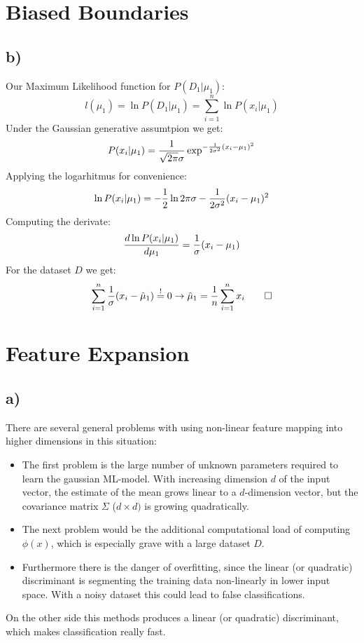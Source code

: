 \documentclass[paper=a4,fontsize=10pt,DIV11,BCOR10mm]{scrartcl}
\begin{document}
\section{Biased Boundaries}
\subsection*{b)}
	Our Maximum Likelihood function for $P(D_1|\mu_1)$:
	\[
	l(\mu_1) = \ln P(D_1|\mu_1) = \sum_{i=1}^n \ln P(x_i|\mu_1)
	\]
	Under the Gaussian generative assumtpion we get:
	\[
		P(x_i|\mu_1) = \frac{1}{\sqrt{2\pi}\sigma}\exp^{-\frac{1}{2\sigma^2}(x_i-\mu_1)^2}\\
	\]
	Applying the logarhitmus for convenience:
	\[
		\ln P(x_i|\mu_1) =-\frac{1}{2} \ln 2\pi \sigma -\frac{1}{2\sigma^2}(x_i-\mu_1)^2\\
	\]
	Computing the derivate:
	\[	
		\frac{d \ln P(x_i|\mu_1)}{d \mu_1} = \frac{1}{\sigma}(x_i- \mu_1)\\
	\]
	For the dataset $D$ we get:
	\[
		\sum_{i=1}^n \frac{1}{\sigma}(x_i- \hat{\mu}_1) \stackrel{!}{=} 0\\
	\rightarrow \hat{\mu}_1=\frac{1}{n} \sum_{i=1}^n x_i \qed
	\]
\section{Feature Expansion}
	\subsection*{a)} There are several general problems with using non-linear feature mapping into higher dimensions in this situation:
	\begin{itemize}
	\item The first problem is the large number of unknown parameters required to learn the gaussian ML-model. With increasing dimension $d$ of the input vector, the estimate of the mean grows linear to a $d$-dimension vector, but the covariance matrix $\Sigma$ ($d \times d)$ is growing quadratically.
	\item The next problem would be the additional computational load of computing $\phi(x)$, which is especially grave with a large dataset $D$.
	\item Furthermore there is the danger of overfitting, since the linear (or quadratic) discriminant is segmenting the training data non-linearly in lower input space. With a noisy dataset this could lead to false classifications.
	\end{itemize}
	On the other side this methods produces a linear (or quadratic) discriminant, which makes classification really fast.
	
\end{document}
